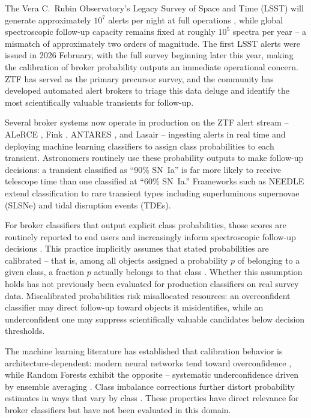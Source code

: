 \documentclass[twocolumn]{aastex631}
\begin{document}
The Vera C.~Rubin Observatory's Legacy Survey of Space and Time
(LSST) will generate approximately $10^7$ alerts per night at full
operations \citep{ivezic2019}, while global spectroscopic follow-up
capacity remains fixed at roughly $10^5$ spectra per year -- a mismatch
of approximately two orders of magnitude. The first LSST alerts were
issued in 2026 February, with the full survey beginning later this
year, making the calibration of broker probability outputs an immediate
operational concern. ZTF \citep{bellm2019} has served as the primary
precursor survey, and the community has developed automated alert
brokers to triage this data deluge and identify the most scientifically
valuable transients for follow-up.

Several broker systems now operate in production on the ZTF alert
stream -- ALeRCE \citep{forster2021}, Fink \citep{moller2021}, ANTARES
\citep{narayan2018}, and Lasair \citep{smith2019} -- ingesting alerts in
real time and deploying machine learning classifiers to assign class
probabilities to each transient. Astronomers routinely use these
probability outputs to make follow-up decisions: a transient classified
as ``90\% SN~Ia'' is far more likely to receive telescope time than one
classified at ``60\% SN~Ia.'' Frameworks such as NEEDLE \citep{sheng2024}
extend classification to rare transient types including superluminous
supernovae (SLSNe) and tidal disruption events (TDEs).

For broker classifiers that output explicit class probabilities, those
scores are routinely reported to end users and increasingly inform
spectroscopic follow-up decisions \citep{forster2021, moller2021,
sheng2024}. This practice implicitly assumes that stated probabilities
are calibrated -- that is, among all objects assigned a probability $p$
of belonging to a given class, a fraction $p$ actually belongs to that
class \citep{dawid1982}. Whether this assumption holds has not previously
been evaluated for production classifiers on real survey data.
Miscalibrated probabilities risk misallocated resources: an overconfident
classifier may direct follow-up toward objects it misidentifies, while an
underconfident one may suppress scientifically valuable candidates below
decision thresholds.

The machine learning literature has established that calibration behavior
is architecture-dependent: modern neural networks tend toward
overconfidence \citep{guo2017}, while Random Forests exhibit the
opposite -- systematic underconfidence driven by ensemble averaging
\citep{niculescumizil2005, bostrom2008}. Class imbalance corrections
further distort probability estimates in ways that vary by class
\citep{vandengoorbergh2022}. These properties have direct relevance for
broker classifiers but have not been evaluated in this domain.
\end{document}
